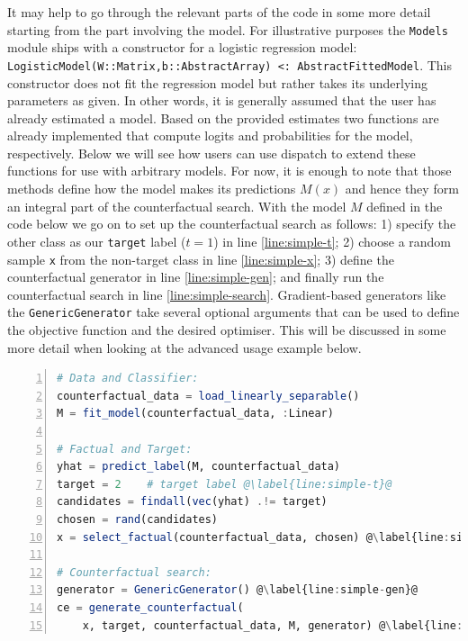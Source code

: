 \documentclass{juliacon}
\begin{document}
It may help to go through the relevant parts of the code in some more
detail starting from the part involving the model. For illustrative
purposes the \texttt{Models} module ships with a constructor for a
logistic regression model:
\texttt{LogisticModel(W::Matrix,b::AbstractArray)\ \textless{}:\ AbstractFittedModel}.
This constructor does not fit the regression model but rather takes its
underlying parameters as given. In other words, it is generally assumed
that the user has already estimated a model. Based on the provided
estimates two functions are already implemented that compute logits and
probabilities for the model, respectively. Below we will see how users
can use dispatch to extend these functions for use with arbitrary
models. For now, it is enough to note that those methods define how the
model makes its predictions \(M(x)\) and hence they form an integral
part of the counterfactual search. With the model \(M\) defined in the
code below we go on to set up the counterfactual search as follows: 1)
specify the other class as our \texttt{target} label (\(t=1\)) in line
\ref{line:simple-t}; 2) choose a random sample \texttt{x} from the
non-target class in line \ref{line:simple-x}; 3) define the
counterfactual generator in line \ref{line:simple-gen}; and finally run
the counterfactual search in line \ref{line:simple-search}.
Gradient-based generators like the \texttt{GenericGenerator} take
several optional arguments that can be used to define the objective
function and the desired optimiser. This will be discussed in some more
detail when looking at the advanced usage example below.

\begin{lstlisting}[language=Julia, escapechar=@, numbers=left, label={lst:simple}, caption={Standard workflow for generating counterfactuals.}] 
# Data and Classifier:
counterfactual_data = load_linearly_separable()
M = fit_model(counterfactual_data, :Linear)

# Factual and Target:
yhat = predict_label(M, counterfactual_data)
target = 2    # target label @\label{line:simple-t}@
candidates = findall(vec(yhat) .!= target)
chosen = rand(candidates)
x = select_factual(counterfactual_data, chosen) @\label{line:simple-x}@

# Counterfactual search:
generator = GenericGenerator() @\label{line:simple-gen}@
ce = generate_counterfactual(
    x, target, counterfactual_data, M, generator) @\label{line:simple-search}@
\end{lstlisting}
\end{document}
